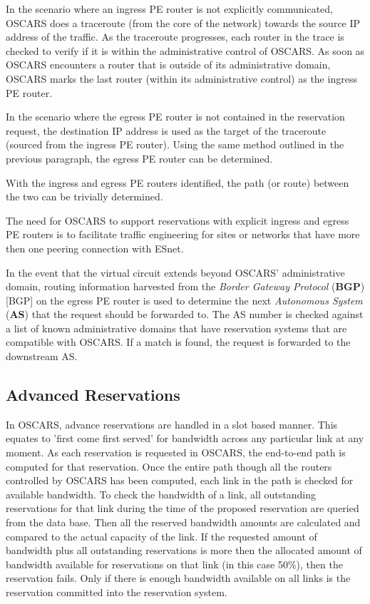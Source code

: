 \documentclass[conference]{IEEEtran}
\begin{document}
In the scenario where an ingress PE router is not explicitly communicated, 
OSCARS does a traceroute (from the core of the network) towards the source IP 
address of the traffic. As the traceroute
progresses, each router in the trace is checked to verify if 
it is within the administrative control of OSCARS. As soon as OSCARS 
encounters a router that
is outside of its administrative domain, OSCARS marks the last router (within 
its administrative control) as the ingress PE router.

In the scenario where the egress PE router is not contained in the reservation 
request, 
the destination IP address is used as the target of the traceroute (sourced 
from the ingress PE router).
Using the same method outlined in the previous paragraph, the egress PE router 
can be determined.

With the ingress and egress PE routers identified, the path (or route) between 
the two can be trivially determined.

The need for OSCARS to support reservations with explicit ingress and egress PE
routers is to
facilitate traffic engineering for sites or networks that have more then one 
peering connection with ESnet.

In the event that the virtual circuit extends beyond OSCARS' administrative 
domain,
routing information harvested from the \emph{Border Gateway Protocol} 
(\textbf{BGP}) [BGP] on the egress PE router is used to determine the next
\emph{Autonomous System} (\textbf{AS}) that the request should be forwarded 
to.   The AS number is
checked against a list of known administrative domains that have reservation 
systems
that are compatible with OSCARS.  If a match is found, the request is 
forwarded to the downstream AS.

\subsection{Advanced Reservations }
In OSCARS, advance reservations are handled in a slot based manner. This equates
to 'first come first served' for bandwidth across any particular link at any
moment. As each reservation is requested in OSCARS, the end-to-end path is
computed for that reservation. Once the entire path though all the routers
controlled by OSCARS has been computed, each link in the path is checked for
available bandwidth. To check the bandwidth of a link, all outstanding
reservations for that link during the time of the proposed reservation are
queried from the data base. Then all the reserved bandwidth amounts are
calculated and compared to the actual capacity of the link. If the requested
amount of bandwidth plus all outstanding reservations is more then the allocated
amount of bandwidth available for reservations on that link (in this case
50\%), then the reservation fails. Only if there is enough bandwidth 
available on all links is the reservation committed into the reservation system.
\end{document}
